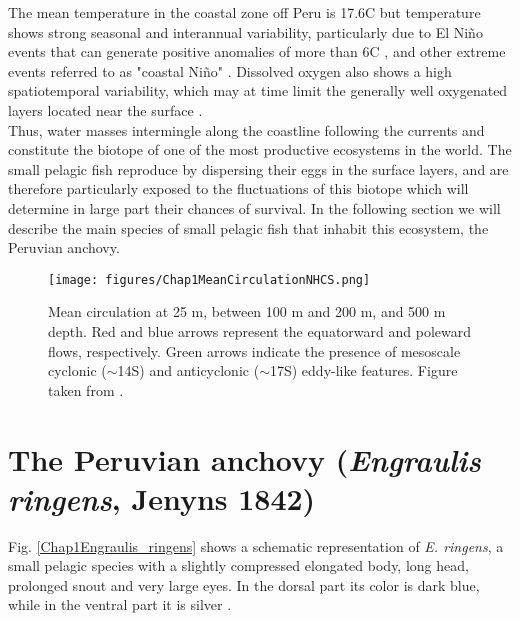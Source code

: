 The mean temperature in the coastal zone off Peru is 17.6\textdegree C \citep{Mont2003} but temperature shows strong seasonal and interannual variability, particularly due to El Niño events that can generate positive anomalies of more than 6\textdegree C  \citep{Sanc2000,Cai2014,Cai2017,Cai2018,Freu2019}, and other extreme events referred to as "coastal Niño" \citep{Eche2018,Garr2018,Hu2019,Rodr2019,TakaMart2019}. Dissolved oxygen also shows a high spatiotemporal variability, which may at time limit the generally well oxygenated layers located near the surface \citep{EspiEche2017,EspiEche2019}.\\

Thus, water masses intermingle along the coastline following the currents and constitute the biotope of one of the most productive ecosystems in the world. The small pelagic fish reproduce by dispersing their eggs in the surface layers, and are therefore particularly exposed to the fluctuations of this biotope which will determine in large part their chances of survival. In the following section we will describe the main species of small pelagic fish that inhabit this ecosystem, the Peruvian anchovy.\\

\begin{figure}[ht]
	\texttt{[image: figures/Chap1MeanCirculationNHCS.png]}
	\centering
	\caption{Mean circulation at 25 m, between 100 m and 200 m, and 500 m depth. Red and blue arrows represent the equatorward and poleward flows, respectively. Green arrows indicate the presence of mesoscale cyclonic ($\sim$14\textdegree S) and anticyclonic ($\sim$17\textdegree S) eddy-like features. Figure taken from \cite{ChaiDomi2013}.}
	\label{Chap1MeanCirculationNHCS}
\end{figure}

\clearpage

\section{The Peruvian anchovy (\textit{Engraulis ringens}, Jenyns 1842)}\label{Chap1PeruAnch}

Fig. \ref{Chap1Engraulis_ringens} shows a schematic representation of \textit{E. ringens}, a small pelagic species with a slightly compressed elongated body, long head, prolonged snout and very large eyes. In the dorsal part its color is dark blue, while in the ventral part it is silver \citep{Whit1988}.\\

